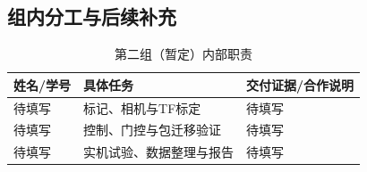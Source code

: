\subsection{组内分工与后续补充}
\begin{table}[htbp]\centering\small
\begin{tabularx}{\linewidth}{p{28mm}YY}\toprule
姓名/学号 & 具体任务 & 交付证据/合作说明\\\midrule
待填写 & 标记、相机与TF标定 & 待填写\\
待填写 & 控制、门控与包迁移验证 & 待填写\\
待填写 & 实机试验、数据整理与报告 & 待填写\\\bottomrule
\end{tabularx}\caption{第二组（暂定）内部职责}\end{table}
